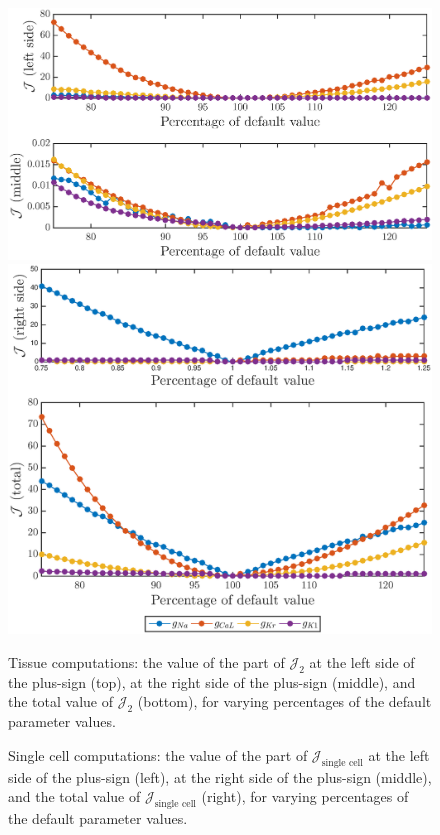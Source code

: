 \documentclass[12pt,a4paper]{article}
\begin{document}
\begin{figure}
\includegraphics[trim=0cm 8cm 0cm 1cm, clip=true, width=1\linewidth]{J2_functional_evaluations} 
\includegraphics[trim=0cm 1cm 0cm 1cm, clip=true, width=1\linewidth]{J2_functional_values2} 
    \caption{Tissue computations: the value of the part of $\mathcal{J}_2$ at the left side of the plus-sign (top), at the right side of the plus-sign (middle), and the total value of $\mathcal{J}_2$ (bottom), for varying percentages of the default parameter values.}
    \label{fig:9a}
\end{figure}
%
\begin{figure}
    \caption{Single cell computations: the value of the part of $\mathcal{J}_{\text{single cell}}$ at the left side of the plus-sign (left), at the right side of the plus-sign (middle), and the total value of $\mathcal{J}_{\text{single cell}}$ (right), for varying percentages of the default parameter values.}
    \label{fig:10}
\end{figure}
\end{document}

